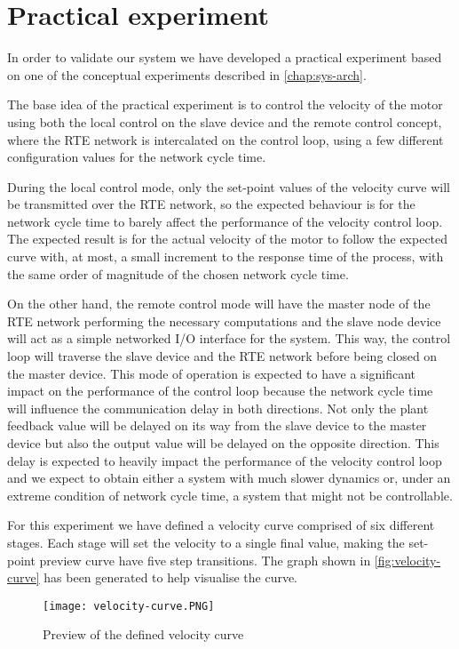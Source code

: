 \section{Practical experiment}
In order to validate our system we have developed a practical experiment based on one of the conceptual experiments described in \autoref{chap:sys-arch}.

The base idea of the practical experiment is to control the velocity of the motor using both the local control on the slave device and the remote control concept, where the RTE network is intercalated on the control loop, using a few different configuration values for the network cycle time.

During the local control mode, only the set-point values of the velocity curve will be transmitted over the RTE network, so the expected behaviour is for the network cycle time to barely affect the performance of the velocity control loop.
The expected result is for the actual velocity of the motor to follow the expected curve with, at most, a small increment to the response time of the process, with the same order of magnitude of the chosen network cycle time.

On the other hand, the remote control mode will have the master node of the RTE network performing the necessary computations and the slave node device will act as a simple networked I/O interface for the system.
This way, the control loop will traverse the slave device and the RTE network before being closed on the master device.
This mode of operation is expected to have a significant impact on the performance of the control loop because the network cycle time will influence the communication delay in both directions.
Not only the plant feedback value will be delayed on its way from the slave device to the master device but also the output value will be delayed on the opposite direction.
This delay is expected to heavily impact the performance of the velocity control loop and we expect to obtain either a system with much slower dynamics or, under an extreme condition of network cycle time, a system that might not be controllable.

For this experiment we have defined a velocity curve comprised of six different stages.
Each stage will set the velocity to a single final value, making the set-point preview curve have five step transitions.
The graph shown in \autoref{fig:velocity-curve} has been generated to help visualise the curve.

\begin{figure}[htp]
	\centering
	\texttt{[image: velocity-curve.PNG]}
	\caption{Preview of the defined velocity curve}
	\label{fig:velocity-curve}
\end{figure}

